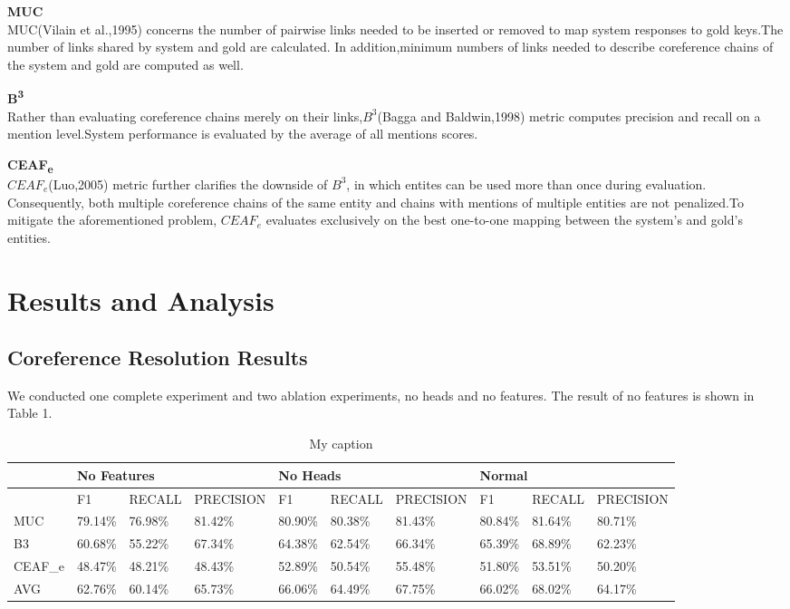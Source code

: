 \documentclass[11pt]{article}
\begin{document}
\textbf{MUC}\\
MUC(Vilain et al.,1995) concerns the number of pairwise links needed to be inserted or removed to map system responses to gold keys.The number of links shared by  system and gold are calculated. In addition,minimum numbers of links needed to describe coreference chains of the system and gold are computed as well.

\textbf{B\textsuperscript{3}} \\
Rather than evaluating coreference chains merely on their links,$B^{3}$(Bagga and Baldwin,1998) metric computes precision and recall on a mention level.System performance is evaluated by the average of all mentions scores.

\textbf{CEAF\textsubscript{e}} \\
$CEAF_e$(Luo,2005) metric further clarifies the downside of $B^{3}$, in which entites can be used more than once during evaluation. Consequently, both multiple coreference chains of the same entity and chains with mentions of multiple entities are not penalized.To mitigate the aforementioned problem, $CEAF_e$ evaluates exclusively on the best one-to-one mapping between the system’s and gold’s entities.


\section{Results and Analysis}

\subsection{Coreference Resolution Results}
We conducted one complete experiment and two ablation experiments, no heads and no features. The result of no features is shown in Table 1.

\begin{table}[]
\centering
\caption{My caption}
\label{my-label}
\begin{tabular}{|l|l|l|l|l|l|l|l|l|l|}
\hline
        & \multicolumn{3}{l|}{No Features} & \multicolumn{3}{l|}{No Heads} & \multicolumn{3}{l|}{Normal}   \\ \hline
        & F1       & RECALL   & PRECISION  & F1      & RECALL  & PRECISION & F1      & RECALL  & PRECISION \\ \hline
MUC     & 79.14\%  & 76.98\%  & 81.42\%    & 80.90\% & 80.38\% & 81.43\%   & 80.84\% & 81.64\% & 80.71\%   \\ \hline
B3      & 60.68\%  & 55.22\%  & 67.34\%    & 64.38\% & 62.54\% & 66.34\%   & 65.39\% & 68.89\% & 62.23\%   \\ \hline
CEAF\_e & 48.47\%  & 48.21\%  & 48.43\%    & 52.89\% & 50.54\% & 55.48\%   & 51.80\% & 53.51\% & 50.20\%   \\ \hline
AVG     & 62.76\%  & 60.14\%  & 65.73\%    & 66.06\% & 64.49\% & 67.75\%   & 66.02\% & 68.02\% & 64.17\%   \\ \hline
\end{tabular}
\end{table}
\end{document}
